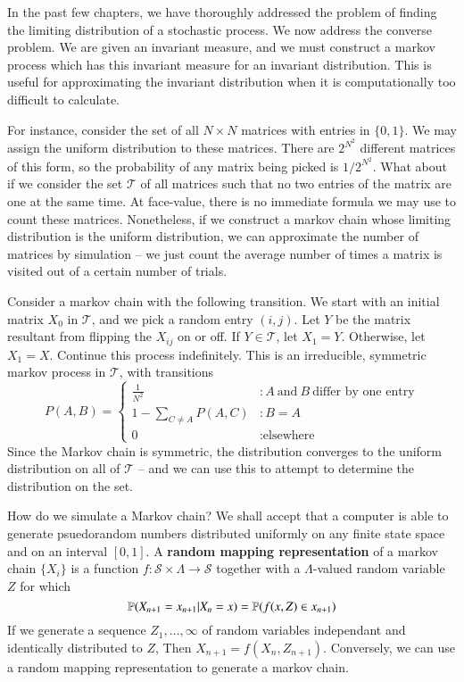 In the past few chapters, we have thoroughly addressed the problem of finding the limiting distribution of a stochastic process. We now address the converse problem. We are given an invariant measure, and we must construct a markov process which has this invariant measure for an invariant distribution. This is useful for approximating the invariant distribution when it is computationally too difficult to calculate.

For instance, consider the set of all $N \times N$ matrices with entries in $\{0,1\}$. We may assign the uniform distribution to these matrices. There are $2^{N^2}$ different matrices of this form, so the probability of any matrix being picked is $1/2^{N^2}$. What about if we consider the set $\mathcal{T}$ of all matrices such that no two entries of the matrix are one at the same time. At face-value, there is no immediate formula we may use to count these matrices. Nonetheless, if we construct a markov chain whose limiting distribution is the uniform distribution, we can approximate the number of matrices by simulation -- we just count the average number of times a matrix is visited out of a certain number of trials.

Consider a markov chain with the following transition. We start with an initial matrix $X_0$ in $\mathcal{T}$, and we pick a random entry $(i,j)$. Let $Y$ be the matrix resultant from flipping the $X_{ij}$ on or off. If $Y \in \mathcal{T}$, let $X_1 = Y$. Otherwise, let $X_1 = X$. Continue this process indefinitely. This is an irreducible, symmetric markov process in $\mathcal{T}$, with transitions
%
\[
    P(A,B) =
    \begin{cases}
        \frac{1}{N^2} & : A\ \text{and}\ B\ \text{differ by one entry}\\
        1 - \sum_{C \neq A} P(A,C) & : B = A\\
        0 & : \text{elsewhere}
    \end{cases}
\]
%
Since the Markov chain is symmetric, the distribution converges to the uniform distribution on all of $\mathcal{T}$ -- and we can use this to attempt to determine the distribution on the set.

How do we simulate a Markov chain? We shall accept that a computer is able to generate psuedorandom numbers distributed uniformly on any finite state space and on an interval $[0,1]$. A {\bf random mapping representation} of a markov chain $\{ X_i \}$ is a function $f:\mathcal{S} \times \Lambda \to \mathcal{S}$ together with a $\Lambda$-valued random variable $Z$ for which
%
\[ \operatorname{\mathbb{P}}(X_{n+1} = x_{n+1} | X_n = x) = \operatorname{\mathbb{P}}(f(x,Z) \in x_{n+1}) \]
%
If we generate a sequence $Z_1, \dots, \infty$ of random variables independant and identically distributed to $Z$, Then $X_{n+1} = f(X_n,Z_{n+1})$. Conversely, we can use a random mapping representation to generate a markov chain.

